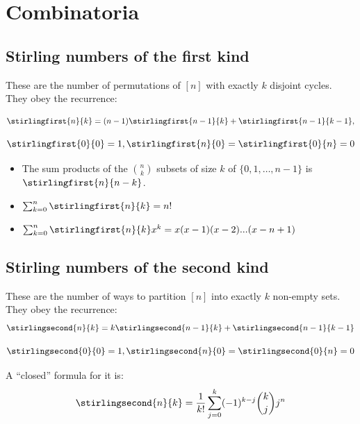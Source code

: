 \section{Combinatoria}

\subsection{Stirling numbers of the first kind} These are the number of permutations of $[n]$ with exactly $k$ disjoint cycles. They obey the recurrence:

  \begin{equation*}
    \stirlingfirst{n}{k} = (n-1)\stirlingfirst{n-1}{k} + \stirlingfirst{n-1}{k-1},
  \end{equation*}
  
  \begin{equation*}
    \stirlingfirst{0}{0} = 1, \stirlingfirst{n}{0} = \stirlingfirst{0}{n} = 0
  \end{equation*}
  
\begin{itemize}
    \item The sum products of the $\binom{n}{k}$ subsets of size $k$ of $\{0, 1, \dots, n-1\}$ is $\stirlingfirst{n}{n-k}$.
    
    \item $\sum_{k=0}^n \stirlingfirst{n}{k} = n!$

    \item $\sum_{k=0}^{n}\stirlingfirst{n}{k}x^k = x(x-1)(x-2)...(x-n+1)$
\end{itemize}


\subsection{Stirling numbers of the second kind} These are the number of ways 
to partition $[n]$ into exactly $k$ non-empty sets. They obey the recurrence:
  \begin{equation*}
    \stirlingsecond{n}{k} = k\stirlingsecond{n-1}{k} + \stirlingsecond{n-1}{k-1}
  \end{equation*}
  
  \begin{equation*}
    \stirlingsecond{0}{0} = 1, \stirlingsecond{n}{0} = \stirlingsecond{0}{n} = 0
  \end{equation*}

  A ``closed'' formula for it is:
  \begin{equation*}
    \stirlingsecond{n}{k} = \frac{1}{k!}\sum_{j=0}^k (-1)^{k-j} \binom{k}{j} j^n
  \end{equation*}



